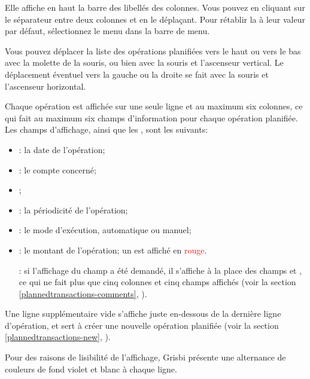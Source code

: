 Elle affiche en haut la barre des libellés des colonnes. Vous pouvez  en cliquant sur le séparateur entre deux colonnes et en le déplaçant. Pour rétablir la  à leur valeur par défaut, sélectionnez le menu  dans la barre de menu.

Vous pouvez déplacer la liste des opérations planifiées vers le haut ou vers le bas avec la molette de la souris, ou bien avec la souris et l'ascenseur vertical. Le déplacement éventuel vers la gauche ou la droite se fait avec la souris et l'ascenseur horizontal.

Chaque opération est affichée sur une seule ligne et au maximum six colonnes, ce qui fait au maximum six champs d'information pour chaque opération planifiée. Les champs d'affichage, ainsi que les , sont les suivants:
\begin{itemize}
	\item {}: la date de l'opération;
	\item {}: le compte concerné;
	\item {};
	\item {}: la périodicité de l'opération;
	\item {}: le mode d'exécution, automatique ou manuel;
	\item {}: le montant de l'opération; un  est affiché en \textcolor{red}{rouge}.

	\Note{}: si l'affichage du champ  a été demandé, il s'affiche à la place des champs  et , ce qui ne fait plus que cinq colonnes et cinq champs affichés (voir la section \vref{plannedtransactions-comments}, ).
\end{itemize}

Une ligne supplémentaire vide s'affiche juste en-dessous de la dernière ligne d'opération, et sert à créer une nouvelle opération planifiée (voir la section \vref{plannedtransactions-new}, ).

Pour des raisons de lisibilité de l'affichage, Grisbi présente une alternance de couleurs de \colorbox[RGB]{215,215,255}{fond violet} et blanc à chaque ligne.

